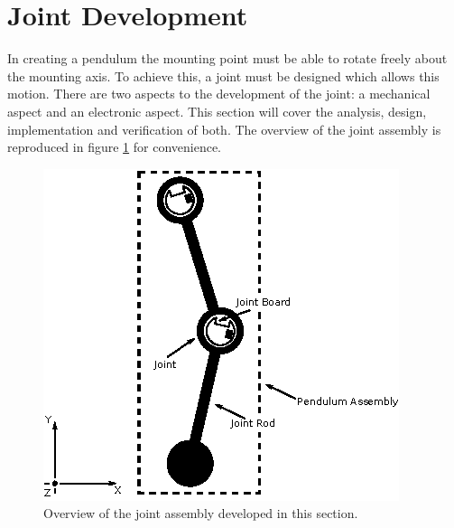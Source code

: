 \section{Joint Development}
\label{sec:joint_development}
In creating a pendulum the mounting point must be able to rotate freely about the mounting axis.
To achieve this, a joint must be designed which allows this motion.
There are two aspects to the development of the joint: a mechanical aspect and an electronic aspect.
This section will cover the analysis, design, implementation and verification of both.
The overview of the joint assembly is reproduced in figure \ref{fig:joint_assembly} for convenience.

\begin{figure}[h]
	\centering
	\includegraphics[width=.5\linewidth]{graphics/joint_assembly}
	\caption{Overview of the joint assembly developed in this section.}
	\label{fig:joint_assembly}
\end{figure}






